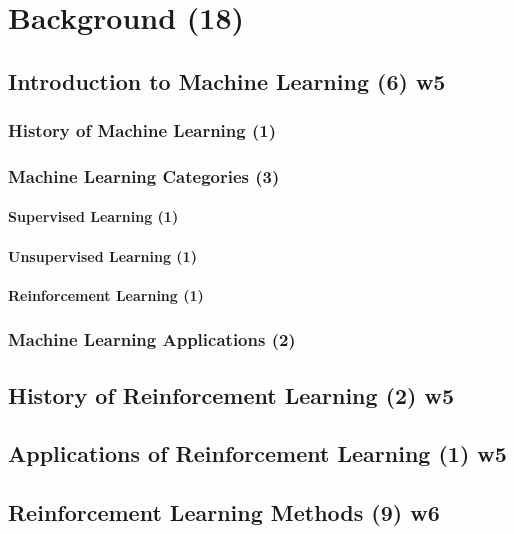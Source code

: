 \chapter{Background (18)}
\label{ch:background}


\section{Introduction to Machine Learning (6) w5}
\label{sec:introductionToMachineLearning}

\subsection{History of Machine Learning (1)}
\label{subsec:mlHistory}

\subsection{Machine Learning Categories (3)}
\label{subsec:mlCategories}

\subsubsection{Supervised Learning (1)}
\subsubsection{Unsupervised Learning (1)}
\subsubsection{Reinforcement Learning (1)}

\subsection{Machine Learning Applications (2)}
\label{subsec:mlApplications}


\section{History of Reinforcement Learning (2) w5}
\label{sec:rlhistory}


\section{Applications of Reinforcement Learning (1) w5}
\label{sec:rlApplications}


\section{Reinforcement Learning Methods (9) w6}
\label{sec:rlMethods}

